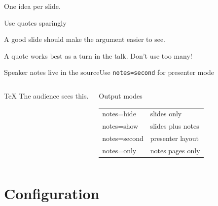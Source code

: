 \documentclass[aspectratio=169]{beamer}
\begin{document}
\begin{frame}
  One idea per slide.
\end{frame}

\begin{frame}{Use quotes sparingly}
  \begin{cookiequote}
    A good slide should make the argument easier to see.
  \end{cookiequote}

  \vspace{.4em}
  A quote works best as a turn in the talk. Don't use too many!
\end{frame}

\begin{frame}[fragile]{Speaker notes live in the source}{Use \texttt{notes=second} for presenter mode}
  \begin{columns}[T,onlytextwidth]
      \begin{cookiecode}[title=Inside any frame]{TeX}
The audience sees this.

      \end{cookiecode}

      \begin{block}{Output modes}
        \small
        \begin{tabularx}{\linewidth}{@{}>{\ttfamily}lX@{}}
          notes=hide & slides only \\
          notes=show & slides plus notes \\
          notes=second & presenter layout \\
          notes=only & notes pages only
        \end{tabularx}
      \end{block}

       \hspace{.25em}
  \end{columns}

\end{frame}

\section{Configuration}
\end{document}
